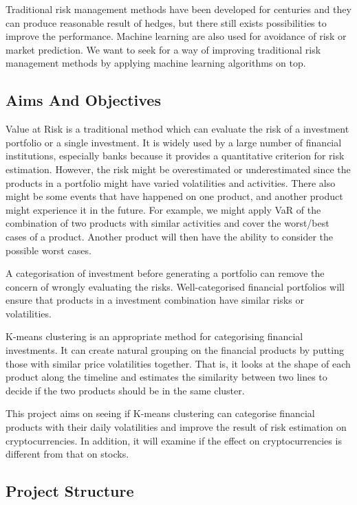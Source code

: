 \documentclass[11pt]{article} %
\theoremstyle{plain}
\theoremstyle{definition}
\begin{document}
Traditional risk management methods have been developed for centuries and they can produce reasonable result of hedges, but there still exists possibilities to improve the performance. Machine learning are also used for avoidance of risk or market prediction. We want to seek for a way of improving traditional risk management methods by applying machine learning algorithms on top.

\subsection{Aims And Objectives}

Value at Risk is a traditional method which can evaluate the risk of a investment portfolio or a single investment. It is widely used by a large number of financial institutions, especially banks because it provides a quantitative criterion for risk estimation. However, the risk might be overestimated or underestimated since the products in a portfolio might have varied volatilities and activities. There also might be some events that have happened on one product, and another product might experience it in the future. For example, we might apply VaR of the combination of two products with similar activities and cover the worst/best cases of a product. Another product will then have the ability to consider the possible worst cases.

A categorisation of investment before generating a portfolio can remove the concern of wrongly evaluating the risks. Well-categorised financial portfolios will ensure that products in a investment combination have similar risks or volatilities.

K-means clustering is an appropriate method for categorising financial investments. It can create natural grouping on the financial products by putting those with similar price volatilities together. That is, it looks at the shape of each product along the timeline and estimates the similarity between two lines to decide if the two products should be in the same cluster.

This project aims on seeing if K-means clustering can categorise financial products with their daily volatilities and improve the result of risk estimation on cryptocurrencies. In addition, it will examine if the effect on cryptocurrencies is different from that on stocks.

\subsection{Project Structure}
\end{document}
